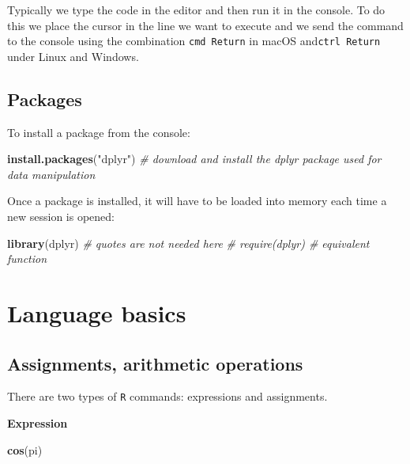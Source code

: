 \documentclass[]{book}
\newenvironment{Shaded}{\begin{snugshade}}{\end{snugshade}}
\newcommand{\CommentTok}[1]{\textcolor[rgb]{0.56,0.35,0.01}{\textit{#1}}}
\newcommand{\KeywordTok}[1]{\textcolor[rgb]{0.13,0.29,0.53}{\textbf{#1}}}
\newcommand{\NormalTok}[1]{#1}
\newcommand{\StringTok}[1]{\textcolor[rgb]{0.31,0.60,0.02}{#1}}
\begin{document}
Typically we type the code in the editor and then run it in the console. To do this we place the cursor in the line we want to execute and we send the command to the console using the combination \texttt{cmd\ Return} in macOS and\texttt{ctrl\ Return} under Linux and Windows.

\hypertarget{packages}{%
\section{Packages}\label{packages}}

To install a package from the console:

\begin{Shaded}
\begin{Highlighting}[]
\KeywordTok{install.packages}\NormalTok{(}\StringTok{"dplyr"}\NormalTok{)}
\CommentTok{# download and install the dplyr package used for data manipulation}
\end{Highlighting}
\end{Shaded}

Once a package is installed, it will have to be loaded into memory each time a new session is opened:

\begin{Shaded}
\begin{Highlighting}[]
\KeywordTok{library}\NormalTok{(dplyr) }\CommentTok{# quotes are not needed here}
\CommentTok{# require(dplyr) # equivalent function}
\end{Highlighting}
\end{Shaded}

\hypertarget{language-basics}{%
\chapter{Language basics}\label{language-basics}}

\hypertarget{assignments-arithmetic-operations}{%
\section{Assignments, arithmetic operations}\label{assignments-arithmetic-operations}}

There are two types of \texttt{R} commands: expressions and assignments.

\textbf{Expression}

\begin{Shaded}
\begin{Highlighting}[]
\KeywordTok{cos}\NormalTok{(pi)}
\end{Highlighting}
\end{Shaded}
\end{document}
